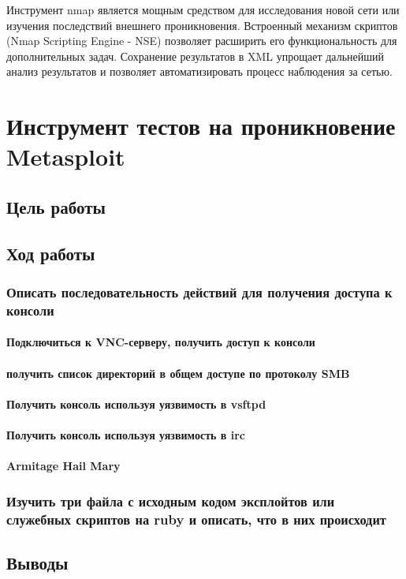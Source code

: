 \documentclass[a4paper, 12pt]{article}		%
\begin{document}
Инструмент nmap является мощным средством для исследования новой сети или изучения последствий внешнего проникновения. Встроенный механизм скриптов (Nmap Scripting Engine - NSE) позволяет расширить его функциональность для дополнительных задач. Сохранение результатов в XML упрощает дальнейший анализ результатов и позволяет автоматизировать процесс наблюдения за сетью.

\newpage
\section{Инструмент тестов на проникновение Metasploit}

\subsection{Цель работы}

\subsection{Ход работы}

\subsubsection{Описать последовательность действий для получения доступа к консоли}

\paragraph{Подключиться к VNC-серверу, получить доступ к консоли}

\paragraph{получить список директорий в общем доступе по протоколу SMB}

\paragraph{Получить консоль используя уязвимость в vsftpd}

\paragraph{Получить консоль используя уязвимость в irc}

\paragraph{Armitage Hail Mary}

\subsubsection{Изучить три файла с исходным кодом эксплойтов или служебных скриптов на ruby и описать, что в них происходит}

\subsection{Выводы}
\end{document}
